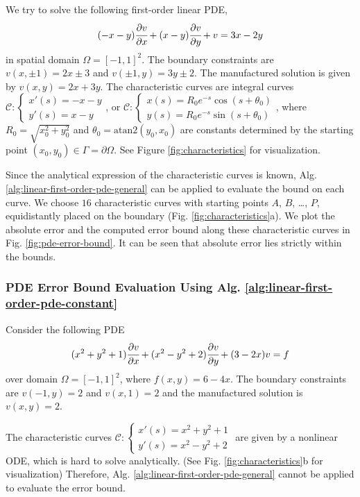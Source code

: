 \documentclass[accepted]{uai2023}
\newcommand{\px}[1]{\cfrac{\partial #1}{\partial x}}
\newcommand{\py}[1]{\cfrac{\partial #1}{\partial y}}
\begin{document}
    We try to solve the following first-order linear PDE,
    {
        \small
        \begin{equation} \label{eq:attractor}
            (-x -y) \px{v} + (x - y) \py{v} + v = 3x - 2 y
        \end{equation}
    }
    in spatial domain $\Omega=[-1, 1]^2$. 
    The boundary constraints are $v(x, \pm1) =2x\pm 3$ and $v(\pm 1, y) = 3y \pm 2$. 
    The manufactured solution is given by $v(x, y) = 2x + 3y$.
    The characteristic curves are integral curves {\small $\mathcal{C}: \begin{cases*} x'(s) = -x - y \\[-0.25em] y'(s) = x - y \end{cases*}$}, or {\small $\mathcal{C}:\begin{cases*} x(s) = R_0 e^{-s} \cos (s+\theta_0)\\[-0.25em] y(s) = R_0 e^{-s} \sin(s + \theta_0) \end{cases*}$}, where $R_0 = \sqrt{x_0^2+y_0^2}$ and $\theta_0 = \mathrm{atan2}(y_0, x_0)$ are constants determined by the starting point $(x_0, y_0) \in \Gamma = \partial \Omega$.
    See Figure \ref{fig:characteristics} for visualization.

    Since the analytical expression of the characteristic curves is known, Alg. \ref{alg:linear-first-order-pde-general} can be applied to evaluate the bound on each curve. 
    We choose $16$ characteristic curves with starting points $A$, $B$, \dots, $P$, equidistantly placed on the boundary (Fig. \ref{fig:characteristics}a). 
    We plot the absolute error and the computed error bound along these characteristic curves in Fig. \ref{fig:pde-error-bound}.
    It can be seen that absolute error lies strictly within the bounds.
\subsubsection{PDE Error Bound Evaluation Using Alg. \ref{alg:linear-first-order-pde-constant}}
    Consider the following PDE 
    {
        \small
        \begin{equation}\label{eq:hard-to-solve-characteristics}
            (x^2+y^2+1)\px{v} + (x^2-y^2+2)\py{v} + (3-2x)v = f
        \end{equation}
    }
    over domain $\Omega = [-1, 1]^2$, where $f(x, y) = 6-4x$.
    The boundary constraints are $v(-1, y) = 2$ and $v(x, 1) = 2$ and the manufactured solution is $v(x, y) = 2$.
    
    The characteristic curves {\small $\mathcal{C}: \begin{cases*} x'(s) = x^2+y^2+1 \\[-0.25em] y'(s) = x^2 - y^2 + 2 \end{cases*}$} are given by a nonlinear ODE, which is hard to solve analytically. 
    (See Fig. \ref{fig:characteristics}b for visualization)
    Therefore, Alg. \ref{alg:linear-first-order-pde-general} cannot be applied to evaluate the error bound. 
\end{document}
